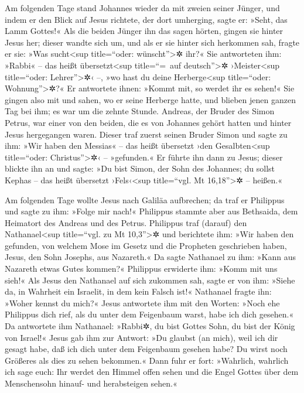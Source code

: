  Am folgenden Tage stand Johannes wieder da mit zweien
seiner Jünger,  und indem er den Blick auf Jesus
richtete, der dort umherging, sagte er: »Seht, das Lamm Gottes!«
 Als die beiden Jünger ihn das sagen hörten, gingen sie
hinter Jesus her;  dieser wandte sich um, und als er sie
hinter sich herkommen sah, fragte er sie: »Was sucht\textless sup
title=``oder: wünscht''\textgreater✲ ihr?« Sie antworteten ihm: »Rabbi«
-- das heißt übersetzt\textless sup title=``=~auf deutsch''\textgreater✲
›Meister\textless sup title=``oder: Lehrer''\textgreater✲‹ --, »wo hast
du deine Herberge\textless sup title=``oder: Wohnung''\textgreater✲?«
 Er antwortete ihnen: »Kommt mit, so werdet ihr es
sehen!« Sie gingen also mit und sahen, wo er seine Herberge hatte, und
blieben jenen ganzen Tag bei ihm; es war um die zehnte Stunde.
 Andreas, der Bruder des Simon Petrus, war einer von den
beiden, die es von Johannes gehört hatten und hinter Jesus hergegangen
waren.  Dieser traf zuerst seinen Bruder Simon und sagte
zu ihm: »Wir haben den Messias« -- das heißt übersetzt ›den
Gesalbten\textless sup title=``oder: Christus''\textgreater✲‹ --
»gefunden.«  Er führte ihn dann zu Jesus; dieser blickte
ihn an und sagte: »Du bist Simon, der Sohn des Johannes; du sollst
Kephas -- das heißt übersetzt ›Fels‹\textless sup title=``vgl. Mt
16,18''\textgreater✲ -- heißen.«

 Am folgenden Tage wollte Jesus nach Galiläa aufbrechen;
da traf er Philippus und sagte zu ihm: »Folge mir nach!« 
Philippus stammte aber aus Bethsaida, dem Heimatort des Andreas und des
Petrus.  Philippus traf (darauf) den
Nathanael\textless sup title=``vgl. zu Mt 10,3''\textgreater✲ und
berichtete ihm: »Wir haben den gefunden, von welchem Mose im Gesetz und
die Propheten geschrieben haben, Jesus, den Sohn Josephs, aus Nazareth.«
 Da sagte Nathanael zu ihm: »Kann aus Nazareth etwas
Gutes kommen?« Philippus erwiderte ihm: »Komm mit uns sieh!«
 Als Jesus den Nathanael auf sich zukommen sah, sagte er
von ihm: »Siehe da, in Wahrheit ein Israelit, in dem kein Falsch ist!«
 Nathanael fragte ihn: »Woher kennst du mich?« Jesus
antwortete ihm mit den Worten: »Noch ehe Philippus dich rief, als du
unter dem Feigenbaum warst, habe ich dich gesehen.«  Da
antwortete ihm Nathanael: »Rabbi✲, du bist Gottes Sohn, du bist der
König von Israel!«  Jesus gab ihm zur Antwort: »Du
glaubst (an mich), weil ich dir gesagt habe, daß ich dich unter dem
Feigenbaum gesehen habe? Du wirst noch Größeres als dies zu sehen
bekommen.«  Dann fuhr er fort: »Wahrlich, wahrlich ich
sage euch: Ihr werdet den Himmel offen sehen und die Engel Gottes über
dem Menschensohn hinauf- und herabsteigen sehen.«

